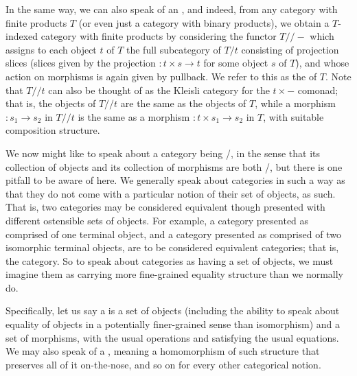 \begin{definition}
In the same way, we can also speak of an , and indeed, from any category with finite products $T$ (or even just a category with binary products), we obtain a $T$-indexed category with finite products by considering the functor $T//-$ which assigns to each object $t$ of $T$ the full subcategory of $T/t$ consisting of projection slices (slices given by the projection $: t \times s \to t$ for some object $s$ of $T$), and whose action on morphisms is again given by pullback. We refer to this as the  of $T$. Note that $T//t$ can also be thought of as the Kleisli category for the $t \times -$ comonad; that is, the objects of $T//t$ are the same as the objects of $T$, while a morphism $: s_1 \to s_2$ in $T//t$ is the same as a morphism $: t \times s_1 \to s_2$ in $T$, with suitable composition structure.
\end{definition}

We now might like to speak about a category being \repsmall/, in the sense that its collection of objects and its collection of morphisms are both \repsmall/, but there is one pitfall to be aware of here. We generally speak about categories in such a way as that they do not come with a particular notion of their set of objects, as such. That is, two categories may be considered equivalent though presented with different ostensible sets of objects. For example, a category presented as comprised of one terminal object, and a category presented as comprised of two isomorphic terminal objects, are to be considered equivalent categories; that is, the  category. So to speak about categories as having a set of objects, we must imagine them as carrying more fine-grained equality structure than we normally do.

\begin{definition}
Specifically, let us say a  is a set of objects (including the ability to speak about equality of objects in a potentially finer-grained sense than isomorphism) and a set of morphisms, with the usual operations and satisfying the usual equations.  We may also speak of a , meaning a homomorphism of such structure that preserves all of it on-the-nose, and so on for every other categorical notion.
\end{definition}

